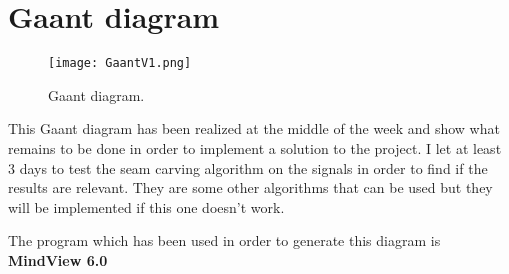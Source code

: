 \chapter*{Gaant diagram}

\begin{figure}[H]
\centering
    \texttt{[image: GaantV1.png]}
    \caption{Gaant diagram.}
    \label{fig:GaantV1}
\end{figure}

This Gaant diagram has been realized at the middle of the week and show what remains to be done in order to implement a solution to the project. I let at least 3 days to test the seam carving algorithm on the signals in order to find if the results are relevant. They are some other algorithms that can be used but they will be implemented if this one doesn't work.

The program which has been used in order to generate this diagram is \textbf{MindView 6.0}
